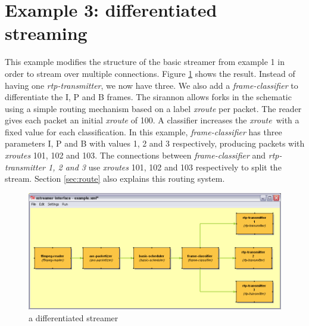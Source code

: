 \documentclass[12pt]{report}
\begin{document}
\section{Example 3: differentiated streaming}
\label{sec:diff}
This example modifies the structure of the basic streamer from example 1 in order to stream over multiple connections. Figure \ref{fig:ex:2} shows the result. Instead of having one \textit{rtp-transmitter}, we now have three. We also add a \textit{frame-classifier} to differentiate the I, P and B frames. The sirannon allows forks in the schematic using a simple routing mechanism based on a label \textit{xroute} per packet. The reader gives each packet an initial \textit{xroute} of 100. A classifier increases the \textit{xroute}\ with a fixed value for each classification. In this example, \textit{frame-classifier} has three parameters I, P and B with values 1, 2 and 3 respectively, producing packets with \textit{xroutes} 101, 102 and 103. The connections between \textit{frame-classifier} and \textit{rtp-transmitter 1, 2 and 3} use \textit{xroutes} 101, 102 and 103 respectively to split the stream. Section \ref{sec:route} also explains this routing system.
\begin{center}
\begin{figure}[!ht]
	\includegraphics[width=1.0\textwidth]{./images/ex02.png}
	\caption{a differentiated streamer}
	\label{fig:ex:2}
\end{figure}
\end{center}
\newpage
\end{document}
